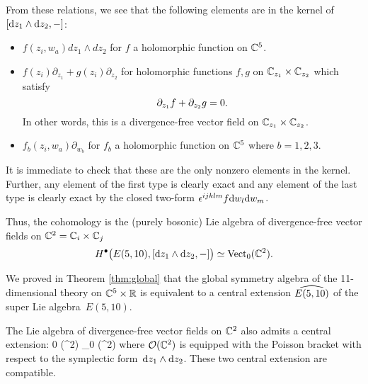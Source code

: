 From these relations, we see that the following elements are in the kernel of $[\d z_1 \wedge \d z_2, -]$:
\begin{itemize}
\item $f(z_i, w_a)dz_1\wedge dz_2$ for $f$ a holomorphic function on $\CC^5$.
\item $f(z_i) \partial_{z_1} + g(z_i) \partial_{z_2}$ for holomorphic functions $f,g$ on $\CC_{z_1} \times \CC_{z_2}$ which satisfy 
\[
\del_{z_1} f + \del_{z_2} g = 0 .
\]
In other words, this is a divergence-free vector field on $\CC_{z_1} \times \CC_{z_2}$. 
\item $f_b(z_i, w_a) \partial_{w_b}$ for $f_b$ a holomorphic function on $\CC^5$ where $b=1,2,3$. 
\end{itemize}
It is immediate to check that these are the only nonzero elements in the kernel. 
Further, any element of the first type is clearly exact and any element of the last type is clearly exact by the closed two-form $\ep^{ijklm} f \d w_l \d w_m$. 

Thus, the cohomology is the (purely bosonic) Lie algebra of divergence-free vector fields on $\CC^2 = \CC_i \times \CC_j$
\[
H^\bu\big(E(5,10), [\d z_1 \wedge \d z_2, -] \big) \simeq \Vect_0(\CC^2) .
\]

We proved in Theorem \ref{thm:global} that the global symmetry algebra of the 11-dimensional theory on $\CC^5 \times \RR$ is equivalent to a central extension $\Hat{E(5,10)}$ of the super Lie algebra~$E(5,10)$. 

The Lie algebra of divergence-free vector fields on $\CC^2$ also admits a central extension:
\beqn\label{eqn:centralvect}
0 \to \CC \to \cO (\CC^2) \to \Vect_0 (\CC^2) 
\eeqn
where $\cO(\CC^2)$ is equipped with the Poisson bracket with respect to the symplectic form~$\d z_1 \wedge \d z_2$.
These two central extension are compatible. 


